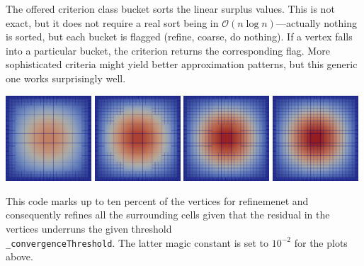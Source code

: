 The offered criterion class bucket sorts the linear surplus values. This is not
exact, but it does not require a real sort being in $\mathcal{O}(n \log
n)$---actually nothing is sorted, but each bucket is flagged (refine, coarse,
do nothing).
If a vertex falls into a particular bucket, the criterion returns the
corresponding flag.
More sophisticated criteria might yield better approximation patterns, but this
generic one works surprisingly well.

\begin{center}
  \includegraphics[width=0.24\textwidth]{42_matrix-free-multigrid/DynamicA00.png}
  \includegraphics[width=0.24\textwidth]{42_matrix-free-multigrid/DynamicA01.png}
  \includegraphics[width=0.24\textwidth]{42_matrix-free-multigrid/DynamicA02.png}
  \includegraphics[width=0.24\textwidth]{42_matrix-free-multigrid/DynamicA03.png}
\end{center}

\noindent
This code marks up to ten percent of the vertices for refinemenet and
consequently refines all the surrounding cells given that the residual in
the vertices underruns the given threshold \\
\texttt{\_convergenceThreshold}.
The latter magic constant is set to $10^{-2}$ for the plots above.

